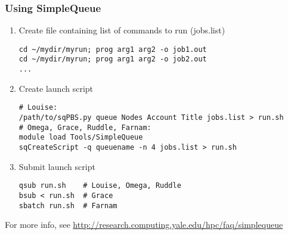 \documentclass[10pt]{beamer}
\begin{document}
\begin{frame}[fragile]
\frametitle{Using SimpleQueue}

\begin{enumerate}
\item Create file containing list of commands to run (jobs.list)
\begin{verbatim}
cd ~/mydir/myrun; prog arg1 arg2 -o job1.out  
cd ~/mydir/myrun; prog arg1 arg2 -o job2.out  
...
\end{verbatim}
\item Create launch script
\begin{verbatim}
# Louise:
/path/to/sqPBS.py queue Nodes Account Title jobs.list > run.sh
# Omega, Grace, Ruddle, Farnam:
module load Tools/SimpleQueue
sqCreateScript -q queuename -n 4 jobs.list > run.sh
\end{verbatim}

\item Submit launch script
\begin{verbatim}
qsub run.sh    # Louise, Omega, Ruddle
bsub < run.sh  # Grace
sbatch run.sh  # Farnam
\end{verbatim}
\end{enumerate}

For more info, see \url{http://research.computing.yale.edu/hpc/faq/simplequeue}

\end{frame}
\end{document}
